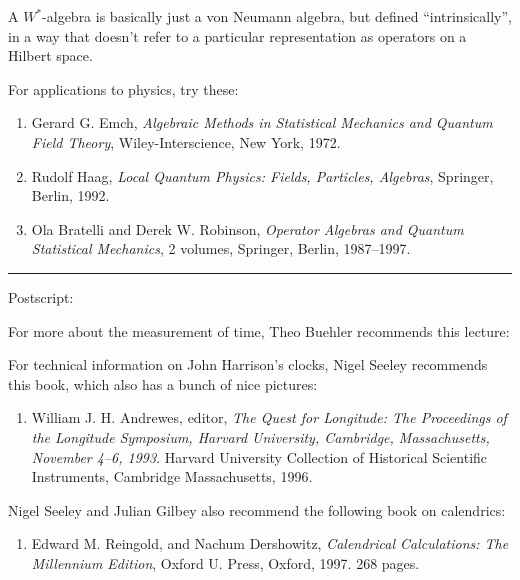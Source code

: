 \documentclass{article}
\def\tightlist{}
\renewcommand{\texttt}[1]{%
  \begingroup
  \ttfamily
  \begingroup\lccode`~=`/\lowercase{\endgroup\def~}{/\discretionary{}{}{}}%
  \begingroup\lccode`~=`[\lowercase{\endgroup\def~}{[\discretionary{}{}{}}%
  \begingroup\lccode`~=`.\lowercase{\endgroup\def~}{.\discretionary{}{}{}}%
  \catcode`/=\active\catcode`[=\active\catcode`.=\active
  \scantokens{#1\noexpand}%
  \endgroup
}
\begin{document}
A \(W^*\)-algebra is basically just a von Neumann algebra, but defined
``intrinsically'', in a way that doesn't refer to a particular
representation as operators on a Hilbert space.

For applications to physics, try these:

\begin{enumerate}
\def\labelenumi{\arabic{enumi})}
\setcounter{enumi}{7}
\item
  Gerard G. Emch, \emph{Algebraic Methods in Statistical Mechanics and
  Quantum Field Theory}, Wiley-Interscience, New York, 1972.
\item
  Rudolf Haag, \emph{Local Quantum Physics: Fields, Particles,
  Algebras}, Springer, Berlin, 1992.
\item
  Ola Bratelli and Derek W. Robinson, \emph{Operator Algebras and
  Quantum Statistical Mechanics}, 2 volumes, Springer, Berlin,
  1987--1997.
\end{enumerate}

\begin{center}\rule{0.5\linewidth}{0.5pt}\end{center}

Postscript:

For more about the measurement of time, Theo Buehler recommends this
lecture:


For technical information on John Harrison's clocks, Nigel Seeley
recommends this book, which also has a bunch of nice pictures:

\begin{enumerate}
\def\labelenumi{\arabic{enumi})}
\setcounter{enumi}{11}
\tightlist
\item
  William J. H. Andrewes, editor, \emph{The Quest for Longitude: The
  Proceedings of the Longitude Symposium, Harvard University, Cambridge,
  Massachusetts, November 4--6, 1993}. Harvard University Collection of
  Historical Scientific Instruments, Cambridge Massachusetts, 1996.
\end{enumerate}

Nigel Seeley and Julian Gilbey also recommend the following book on
calendrics:

\begin{enumerate}
\def\labelenumi{\arabic{enumi})}
\setcounter{enumi}{12}
\tightlist
\item
  Edward M. Reingold, and Nachum Dershowitz, \emph{Calendrical
  Calculations: The Millennium Edition}, Oxford U. Press, Oxford, 1997.
  268 pages.
\end{enumerate}
\end{document}
